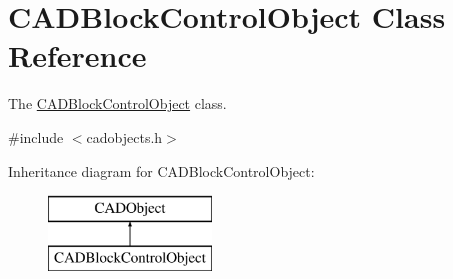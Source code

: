 \hypertarget{class_c_a_d_block_control_object}{}\section{C\+A\+D\+Block\+Control\+Object Class Reference}
\label{class_c_a_d_block_control_object}


The \hyperlink{class_c_a_d_block_control_object}{C\+A\+D\+Block\+Control\+Object} class.  




{\ttfamily \#include $<$cadobjects.\+h$>$}

Inheritance diagram for C\+A\+D\+Block\+Control\+Object\+:\begin{figure}[H]
\begin{center}
\leavevmode
\includegraphics[height=2.000000cm]{class_c_a_d_block_control_object}
\end{center}
\end{figure}
